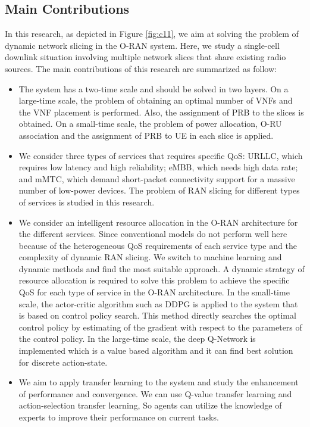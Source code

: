 \documentclass{article}
\begin{document}
\subsection{Main Contributions}
In this research, as depicted in Figure \ref{fig:c11}, we aim at solving the problem of dynamic network slicing in the O-RAN system. 
Here, we study a single-cell downlink situation involving multiple network slices that share existing radio sources.
The main contributions of
this research are summarized as follow:
\begin{itemize}
\item 
The system has a two-time scale and should be solved in two layers. On a large-time scale, the problem of obtaining an optimal number of VNFs and the VNF placement is performed. Also, the assignment of PRB to the slices is obtained. On a small-time scale, the problem of power allocation, O-RU association and the assignment of PRB to UE in each slice is applied.
\item 
We consider three types of services that requires specific QoS: URLLC, which requires low latency and high reliability; eMBB, which needs high data rate; and mMTC, which demand short-packet connectivity support for a massive number of low-power devices.
The problem of RAN slicing for different types of services is studied in this research.

\item 
We consider an intelligent resource allocation in the O-RAN architecture for the different services. Since conventional models do not perform well here because of the heterogeneous QoS requirements of each service type and the complexity of dynamic RAN slicing. We switch to machine learning and dynamic methods and find the most suitable approach.  
A dynamic strategy of resource allocation is required to solve this problem to achieve the specific QoS for each type of service in the O-RAN architecture.
 In the small-time scale, the actor-critic algorithm such as DDPG is applied to the system that is based on control policy search. This method directly searches the optimal control policy
by estimating of the gradient with respect to the parameters
of the control policy. In the large-time scale, the deep Q-Network is implemented which is a value based algorithm and it can find best solution for discrete action-state.
\item 
We aim to apply transfer learning to the system and study the enhancement of performance and convergence. We can use Q-value transfer learning and action-selection transfer learning, So agents can utilize the knowledge of experts to improve their performance on current tasks\cite{zhou2021learning}. 
\end{itemize}
\end{document}
